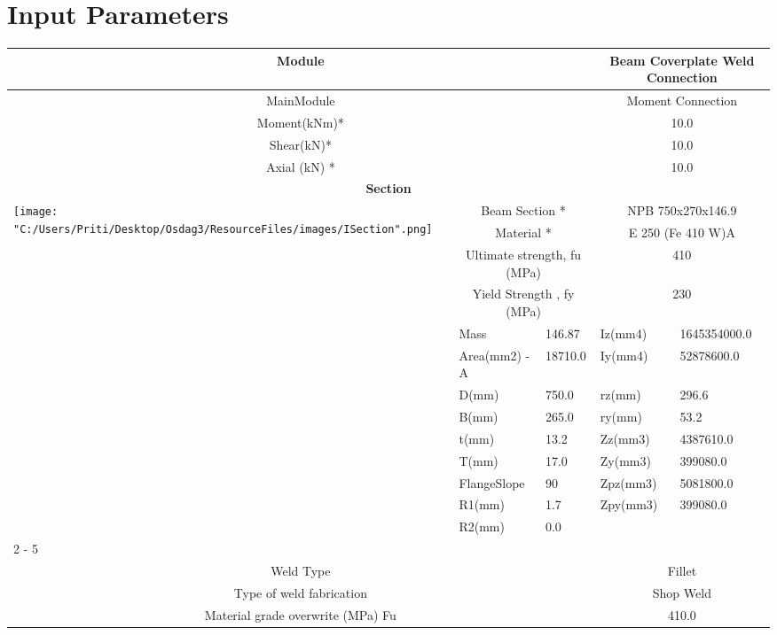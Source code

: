 \documentclass{article}%
\begin{document}
%
\normalsize%
\pagestyle{header}%
\section{Input Parameters}%
\label{sec:InputParameters}%
\renewcommand{\arraystretch}{1.2}%
\begin{longtable}{|p{5cm}|p{2cm}|p{2cm}|p{2cm}|p{5cm}|}%
\hline%
\hline%
\multicolumn{3}{|c|}{Module}&\multicolumn{2}{|c|}{Beam Coverplate  Weld Connection}\\%
\hline%
\hline%
\multicolumn{3}{|c|}{MainModule}&\multicolumn{2}{|c|}{Moment Connection}\\%
\hline%
\hline%
\multicolumn{3}{|c|}{Moment(kNm)*}&\multicolumn{2}{|c|}{10.0}\\%
\hline%
\hline%
\multicolumn{3}{|c|}{Shear(kN)*}&\multicolumn{2}{|c|}{10.0}\\%
\hline%
\hline%
\multicolumn{3}{|c|}{Axial (kN) *}&\multicolumn{2}{|c|}{10.0}\\%
\hline%
\hline%
\multicolumn{5}{|c|}{\textbf{Section}}\\%
\hline%
\hline%
\multirow{13}{*}{\texttt{[image: "C:/Users/Priti/Desktop/Osdag3/ResourceFiles/images/ISection".png]}}&\multicolumn{2}{|c|}{Beam Section *}&\multicolumn{2}{|c|}{NPB 750x270x146.9}\\%
\cline{2%
-%
5}%
&\multicolumn{2}{|c|}{Material *}&\multicolumn{2}{|c|}{E 250 (Fe 410 W)A}\\%
\cline{2%
-%
5}%
&\multicolumn{2}{|c|}{Ultimate strength, fu (MPa)}&\multicolumn{2}{|c|}{410}\\%
\cline{2%
-%
5}%
&\multicolumn{2}{|c|}{Yield Strength , fy (MPa)}&\multicolumn{2}{|c|}{230}\\%
\cline{2%
-%
5}%
&Mass&146.87&Iz(mm4)&1645354000.0\\%
\cline{2%
-%
5}%
&Area(mm2) {-} A&18710.0&Iy(mm4)&52878600.0\\%
\cline{2%
-%
5}%
&D(mm)&750.0&rz(mm)&296.6\\%
\cline{2%
-%
5}%
&B(mm)&265.0&ry(mm)&53.2\\%
\cline{2%
-%
5}%
&t(mm)&13.2&Zz(mm3)&4387610.0\\%
\cline{2%
-%
5}%
&T(mm)&17.0&Zy(mm3)&399080.0\\%
\cline{2%
-%
5}%
&FlangeSlope&90&Zpz(mm3)&5081800.0\\%
\cline{2%
-%
5}%
&R1(mm)&1.7&Zpy(mm3)&399080.0\\%
\cline{2%
-%
5}%
&R2(mm)&0.0&&\\%
\cline{2%
-%
5}%
\hline%
\multicolumn{5}{|c|}{\textbf{Weld Details}}\\%
\hline%
\hline%
\multicolumn{3}{|c|}{Weld Type}&\multicolumn{2}{|c|}{Fillet}\\%
\hline%
\hline%
\multicolumn{3}{|c|}{Type of weld fabrication}&\multicolumn{2}{|c|}{Shop Weld}\\%
\hline%
\hline%
\multicolumn{3}{|c|}{Material grade overwrite (MPa) Fu}&\multicolumn{2}{|c|}{410.0}\\%
\hline%
\end{longtable}
\end{document}
